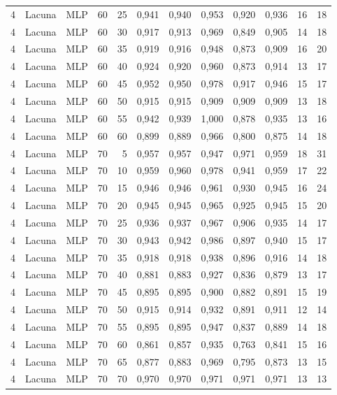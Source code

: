 \begin{longtable}{@{}rllrrrrrrrrr@{}}
4 & Lacuna & MLP & 60 & 25 & 0,941 & 0,940 & 0,953 & 0,920 & 0,936 & 16 & 18 \\
4 & Lacuna & MLP & 60 & 30 & 0,917 & 0,913 & 0,969 & 0,849 & 0,905 & 14 & 18 \\
4 & Lacuna & MLP & 60 & 35 & 0,919 & 0,916 & 0,948 & 0,873 & 0,909 & 16 & 20 \\
4 & Lacuna & MLP & 60 & 40 & 0,924 & 0,920 & 0,960 & 0,873 & 0,914 & 13 & 17 \\
4 & Lacuna & MLP & 60 & 45 & 0,952 & 0,950 & 0,978 & 0,917 & 0,946 & 15 & 17 \\
4 & Lacuna & MLP & 60 & 50 & 0,915 & 0,915 & 0,909 & 0,909 & 0,909 & 13 & 18 \\
4 & Lacuna & MLP & 60 & 55 & 0,942 & 0,939 & 1,000 & 0,878 & 0,935 & 13 & 16 \\
4 & Lacuna & MLP & 60 & 60 & 0,899 & 0,889 & 0,966 & 0,800 & 0,875 & 14 & 18 \\
4 & Lacuna & MLP & 70 & 5 & 0,957 & 0,957 & 0,947 & 0,971 & 0,959 & 18 & 31 \\
4 & Lacuna & MLP & 70 & 10 & 0,959 & 0,960 & 0,978 & 0,941 & 0,959 & 17 & 22 \\
4 & Lacuna & MLP & 70 & 15 & 0,946 & 0,946 & 0,961 & 0,930 & 0,945 & 16 & 24 \\
4 & Lacuna & MLP & 70 & 20 & 0,945 & 0,945 & 0,965 & 0,925 & 0,945 & 15 & 20 \\
4 & Lacuna & MLP & 70 & 25 & 0,936 & 0,937 & 0,967 & 0,906 & 0,935 & 14 & 17 \\
4 & Lacuna & MLP & 70 & 30 & 0,943 & 0,942 & 0,986 & 0,897 & 0,940 & 15 & 17 \\
4 & Lacuna & MLP & 70 & 35 & 0,918 & 0,918 & 0,938 & 0,896 & 0,916 & 14 & 18 \\
4 & Lacuna & MLP & 70 & 40 & 0,881 & 0,883 & 0,927 & 0,836 & 0,879 & 13 & 17 \\
4 & Lacuna & MLP & 70 & 45 & 0,895 & 0,895 & 0,900 & 0,882 & 0,891 & 15 & 19 \\
4 & Lacuna & MLP & 70 & 50 & 0,915 & 0,914 & 0,932 & 0,891 & 0,911 & 12 & 14 \\
4 & Lacuna & MLP & 70 & 55 & 0,895 & 0,895 & 0,947 & 0,837 & 0,889 & 14 & 18 \\
4 & Lacuna & MLP & 70 & 60 & 0,861 & 0,857 & 0,935 & 0,763 & 0,841 & 15 & 16 \\
4 & Lacuna & MLP & 70 & 65 & 0,877 & 0,883 & 0,969 & 0,795 & 0,873 & 13 & 15 \\
4 & Lacuna & MLP & 70 & 70 & 0,970 & 0,970 & 0,971 & 0,971 & 0,971 & 13 & 13 \\

\end{longtable}
